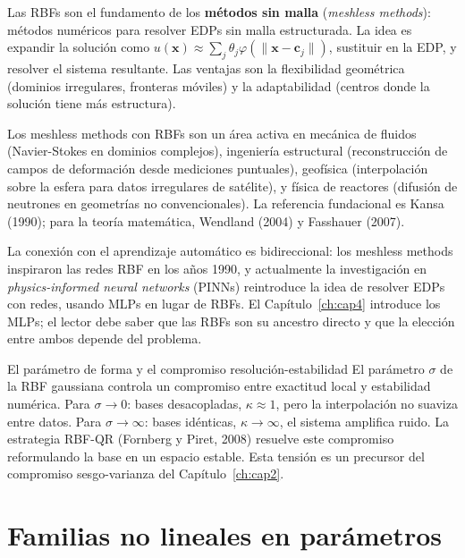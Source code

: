 Las RBFs son el fundamento de los \textbf{métodos sin malla}
(\textit{meshless methods}): métodos numéricos para resolver EDPs sin
malla estructurada. La idea es expandir la solución como
$u(\bm{x}) \approx \sum_j \theta_j\varphi(\|\bm{x}-\bm{c}_j\|)$,
sustituir en la EDP, y resolver el sistema resultante. Las ventajas son
la flexibilidad geométrica (dominios irregulares, fronteras móviles) y la
adaptabilidad (centros donde la solución tiene más estructura).

Los meshless methods con RBFs son un área activa en mecánica de fluidos
(Navier-Stokes en dominios complejos), ingeniería estructural
(reconstrucción de campos de deformación desde mediciones puntuales),
geofísica (interpolación sobre la esfera para datos irregulares de
satélite), y física de reactores (difusión de neutrones en geometrías no
convencionales). La referencia fundacional es Kansa (1990); para la teoría
matemática, Wendland (2004) y Fasshauer (2007).

La conexión con el aprendizaje automático es bidireccional: los meshless
methods inspiraron las redes RBF en los años 1990, y actualmente la
investigación en \textit{physics-informed neural networks} (PINNs)
reintroduce la idea de resolver EDPs con redes, usando MLPs en lugar de
RBFs. El Capítulo~\ref{ch:cap4} introduce los MLPs; el lector debe saber
que las RBFs son su ancestro directo y que la elección entre ambos depende
del problema.

\begin{observacion}{El parámetro de forma y el compromiso resolución-estabilidad}
El parámetro $\sigma$ de la RBF gaussiana controla un compromiso entre
exactitud local y estabilidad numérica. Para $\sigma \to 0$: bases
desacopladas, $\kappa \approx 1$, pero la interpolación no suaviza entre
datos. Para $\sigma \to \infty$: bases idénticas, $\kappa \to \infty$, el
sistema amplifica ruido. La estrategia RBF-QR (Fornberg y Piret, 2008)
resuelve este compromiso reformulando la base en un espacio estable. Esta
tensión es un precursor del compromiso sesgo-varianza del
Capítulo~\ref{ch:cap2}.
\end{observacion}

\section{Familias no lineales en parámetros}
\label{sec:nolineales}

